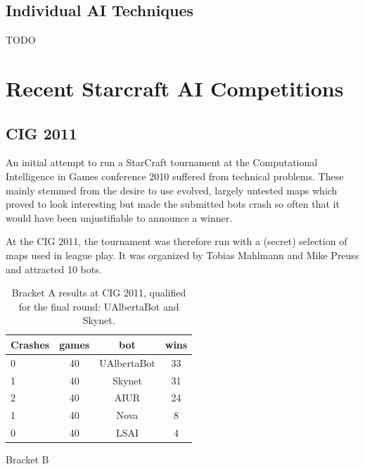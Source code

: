 \documentclass[journal]{IEEEtran}
\begin{document}
\subsection{Individual AI Techniques}\label{sec:techniques}

{\color{red} TODO}

\section{Recent Starcraft AI Competitions}\label{sec:competition}

{\color{magenta}

\subsection{CIG 2011}
\label{sec:cig2011}

An initial attempt to run a StarCraft tournament at the Computational
Intelligence in Games conference 2010 suffered from technical problems.
These mainly stemmed from the desire to use evolved, largely untested
maps which proved to look interesting but made the submitted bots crash
so often that it would have been unjustifiable to announce a winner.

At the CIG 2011, the tournament was therefore run with a (secret) selection
of maps used in league play. It was organized by Tobias Mahlmann and Mike
Preuss and attracted 10 bots.

\begin{table}[htb]
\caption{Bracket A results at CIG 2011, 
qualified for the final round: UAlbertaBot and Skynet.}
\label{tab:correlations}
\begin{small}
\begin{center}
\begin{tabular}{|l|c|c|c|}
\hline
Crashes & games & bot	& wins\\ \hline
0 &	 40 &	 UAlbertaBot &	 33\\
1 &   40 &	 Skynet	  &  31\\
2 &	 40 &	 AIUR	  &  24\\
1 &	 40 &	 Nova	  &  8\\
0 &	 40 &	 LSAI	  &  4\\
\hline
\end{tabular}
\end{center}
\end{small}
\end{table}




Bracket B

}
\end{document}
